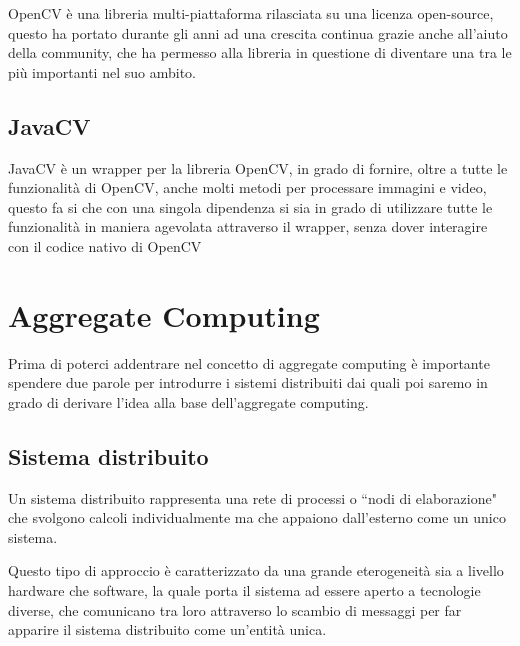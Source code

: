 \documentclass[12pt,a4paper,openright,twoside]{book}
\begin{document}
OpenCV è una libreria multi-piattaforma rilasciata su una licenza open-source, questo ha portato durante gli anni ad una crescita continua grazie anche all'aiuto della community, che ha permesso alla libreria in questione di diventare una tra le più importanti nel suo ambito. \cite{baggio2015opencv} \cite{OpenCVMainPage}

\subsection{JavaCV} \label{subsec:javacv}
JavaCV è un wrapper per la libreria OpenCV, in grado di fornire, oltre a tutte le funzionalità di OpenCV, anche molti metodi per processare immagini e video, questo fa si che con una singola dipendenza si sia in grado di utilizzare tutte le funzionalità in maniera agevolata attraverso il wrapper, senza dover interagire con il codice nativo di OpenCV \cite{javaCVRepo}

\section{Aggregate Computing}
Prima di poterci addentrare nel concetto di aggregate computing è importante spendere due parole per introdurre i sistemi distribuiti dai quali poi saremo in grado di derivare l'idea alla base dell'aggregate computing.

\subsection{Sistema distribuito}
Un sistema distribuito rappresenta una rete di processi o ``nodi di elaborazione" che svolgono calcoli individualmente ma che appaiono dall'esterno come un unico sistema.

Questo tipo di approccio è caratterizzato da una grande eterogeneità sia a livello hardware che software, la quale porta il sistema ad essere aperto a tecnologie diverse, che comunicano tra loro attraverso lo scambio di messaggi per far apparire il sistema distribuito come un'entità unica.
\end{document}
